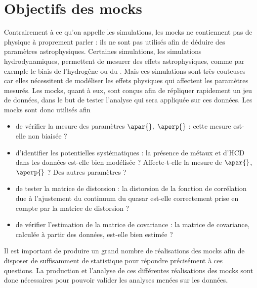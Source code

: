 \section{Objectifs des mocks}
Contrairement à ce qu'on appelle les simulations, les mocks ne contiennent pas de physique à proprement parler : ils ne sont pas utilisés afin de déduire des paramètres astrophysiques. Certaines simulations, les simulations hydrodynamiques, permettent de mesurer des effets astrophysiques, comme par exemple le biais de l'hydrogêne ou du \lya{}. Mais ces simulations sont très couteuses car elles nécessitent de modéliser les effets physiques qui affectent les paramètres mesurés.
Les mocks, quant à eux, sont conçus afin de répliquer rapidement un jeu de données, dans le but de tester l'analyse qui sera appliquée sur ces données.
Les mocks sont donc utilisés afin
\begin{itemize}[label=$\bullet$]
\item de vérifier la mesure des paramètres $\apar{}$, $\aperp{}$ : cette mesure est-elle non biaisée ?
\item d'identifier les potentielles systématiques : la présence de métaux et d'HCD dans les données est-elle bien modélisée ? Affecte-t-elle la mesure de $\apar{}$, $\aperp{}$ ? Des autres paramètres ?
\item de tester la matrice de distorsion : la distorsion de la fonction de corrélation due à l'ajustement du continuum du quasar est-elle correctement prise en compte par la matrice de distorsion ?
\item de vérifier l'estimation de la matrice de covariance : la matrice de covariance, calculée à partir des données, est-elle bien estimée ?
\end{itemize}
Il est important de produire un grand nombre de réalisations des mocks afin de disposer de suffisamment de statistique pour répondre précisément à ces questions. La production et l'analyse de ces différentes réalisations des mocks sont donc nécessaires pour pouvoir valider les analyses menées sur les données.


